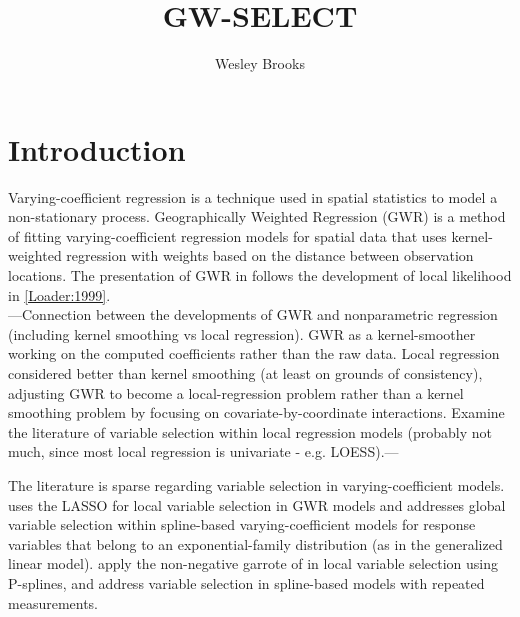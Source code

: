 \documentclass[authoryear, review, 11pt]{elsarticle}
\title{GW-SELECT}
\author{Wesley Brooks}
\date{}                                           %
\begin{document}
\maketitle





\section{Introduction}
	Varying-coefficient regression \cite{Hastie:1993} is a technique used in spatial statistics to model a non-stationary process. Geographically Weighted Regression (GWR) \cite{Fotheringham:2002} is a method of fitting varying-coefficient regression models for spatial data that uses kernel-weighted regression with weights based on the distance between observation locations. The presentation of GWR in \cite{Fotheringham:2002} follows the development of local likelihood in \ref{Loader:1999}.\\
	
	---Connection between the developments of GWR and nonparametric regression (including kernel smoothing vs local regression). GWR as a kernel-smoother working on the computed coefficients rather than the raw data. Local regression considered better than kernel smoothing (at least on grounds of consistency), adjusting GWR to become a local-regression problem rather than a kernel smoothing problem by focusing on covariate-by-coordinate interactions. Examine the literature of variable selection within local regression models (probably not much, since most local regression is univariate - e.g. LOESS).---
	
	The literature is sparse regarding variable selection in varying-coefficient models. \cite{Wheeler:2009} uses the LASSO for local variable selection in GWR models and \cite{Fan:1999} addresses global variable selection within spline-based varying-coefficient models for response variables that belong to an exponential-family distribution (as in the generalized linear model). \cite{Antoniadis:2011} apply the non-negative garrote of \cite{Breiman:1995} in local variable selection using P-splines, and \cite{Wang:2008} address variable selection in spline-based models with repeated measurements.\\
	
\end{document}
